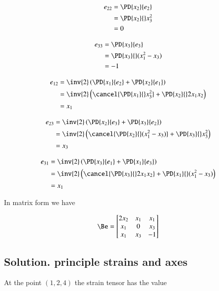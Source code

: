 \begin{align*}
e_{22}
&= \PD{x_2}{e_2} \\
&= \PD{x_2}{} x_3^2 \\
&= 0
\end{align*}

\begin{align*}
e_{33}
&= \PD{x_3}{e_3} \\
&= \PD{x_3}{} ( x_1^2 - x_3 ) \\
&= -1
\end{align*}

\begin{align*}
e_{12}
&=
\inv{2} \left(
\PD{x_1}{e_2}
+
\PD{x_2}{e_1}
\right) \\
&=
\inv{2}
\left(
\cancel{\PD{x_1}{} x_3^2 }
+
\PD{x_2}{} 2 x_1 x_2
\right) \\
&=
x_1
\end{align*}

\begin{align*}
e_{23}
&=
\inv{2} \left(
\PD{x_2}{e_3}
+
\PD{x_3}{e_2}
\right) \\
&=
\inv{2}
\left(
\cancel{\PD{x_2}{} (x_1^2 - x_3 )}
+
\PD{x_3}{} x_3^2
\right) \\
&=
x_3
\end{align*}

\begin{align*}
e_{31}
&=
\inv{2} \left(
\PD{x_3}{e_1}
+
\PD{x_1}{e_3}
\right) \\
&=
\inv{2}
\left(
\cancel{\PD{x_3}{} 2 x_1 x_2 }
+
\PD{x_1}{} (x_1^2 - x_3 )
\right) \\
&=
x_1
\end{align*}

In matrix form we have

\begin{equation}\label{eqn:continuumProblemSet1:250}
\Be =
\begin{bmatrix}
2 x_2 & x_1 & x_1 \\
x_1 & 0 & x_3 \\
x_1 & x_3 & -1 \\
\end{bmatrix}
\end{equation}

\subsection{Solution.  principle strains and axes}

At the point $(1, 2, 4)$ the strain tensor has the value

